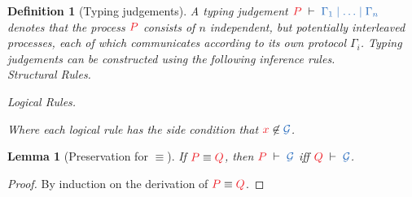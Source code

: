 \documentclass[draft,submission,copyright,creativecommons]{eptcs}
\newtheorem{definition}{Definition}
\newtheorem{lemma}{Lemma}
\begin{document}
\begin{definition}[Typing judgements]\label{def:hcp}
  A typing judgement $\seq[P]{\Gamma_1 \hsep \dots \hsep \Gamma_n}$ denotes
  that the process $\tm{P}$ consists of $n$ independent, but potentially
  interleaved processes, each of which communicates according to its own
  protocol $\Gamma_i$. 
  Typing judgements can be constructed using the following inference rules.
  \\[0.5\baselineskip]
  Structural Rules.
  \begin{center}\hccpInfAx        \hccpInfCycle\end{center}\vspace*{0.5\baselineskip}
  \begin{center}\hccpInfMix       \hccpInfHalt \end{center}\vspace*{0.5\baselineskip}

  Logical Rules.
  \begin{center}\hccpInfBoundTens \hccpInfParr \end{center}\vspace*{0.5\baselineskip}
  \begin{center}\hccpInfOne       \hccpInfBot  \end{center}\vspace*{0.5\baselineskip}
  \begin{center}     \end{center}\vspace*{0.5\baselineskip}
  \begin{center}\hccpInfWith                   \end{center}\vspace*{0.5\baselineskip}
  \begin{center}\hccpInfNil       \hccpInfTop  \end{center}\vspace*{0.5\baselineskip}

  Where each logical rule has the side condition that $\tm{x} \not\in
  \ty{\mathcal{G}}$.
\end{definition}

\begin{lemma}[Preservation for $\equiv$]\label{lem:hcp-preservation-equiv}
  If $\tm{P}\equiv\tm{Q}$, then $\seq[P]{\mathcal{G}}$ iff $\seq[Q]{\mathcal G}$.
\end{lemma}
\begin{proof}
  By induction on the derivation of $\tm{P}\equiv\tm{Q}$.
\end{proof}
\end{document}
